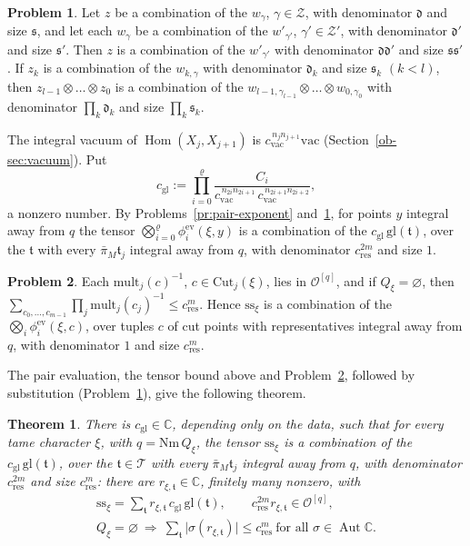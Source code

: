 \documentclass[reqno]{amsart}
\theoremstyle{definition}
\newtheorem{problem}{Problem}[section]
\theoremstyle{plain}
\newtheorem{theorem}{Theorem}[section]
\newcommand{\C}{\mathbb{C}}
\newcommand{\Oc}{\mathcal{O}}
\newcommand{\Tc}{\mathcal{T}}
\newcommand{\Hom}{\operatorname{Hom}}
\newcommand{\Aut}{\operatorname{Aut}}
\newcommand{\Nm}{\mathrm{Nm}\,}
\newcommand{\vac}{\mathrm{vac}}
\newcommand{\gl}{\mathrm{gl}}
\newcommand{\ssx}{\mathrm{ss}_\xi}
\newcommand{\Cut}{\mathrm{Cut}}
\newcommand{\mult}{\mathrm{mult}}
\newcommand{\ev}{\phi^{\mathrm{ev}}}
\newcommand{\cres}{c_{\mathrm{res}}}
\newcommand{\cgl}{c_{\mathrm{gl}}}
\newcommand{\cvac}{c_{\mathrm{vac}}}
\begin{document}
\begin{problem}\label{pr:substitute}
Let \(z\) be a combination of the \(w_\gamma\), \(\gamma\in\mathcal Z\), with denominator \(\mathfrak d\) and size \(\mathfrak s\), and let each \(w_\gamma\) be a combination of the \(w'_{\gamma'}\), \(\gamma'\in\mathcal Z'\), with denominator \(\mathfrak d'\) and size \(\mathfrak s'\).  Then \(z\) is a combination of the \(w'_{\gamma'}\) with denominator \(\mathfrak d\mathfrak d'\) and size \(\mathfrak s\mathfrak s'\).  If \(z_k\) is a combination of the \(w_{k,\gamma}\) with denominator \(\mathfrak d_k\) and size \(\mathfrak s_k\) \((k<l)\), then \(z_{l-1}\otimes\dots\otimes z_0\) is a combination of the \(w_{l-1,\gamma_{l-1}}\otimes\dots\otimes w_{0,\gamma_0}\) with denominator \(\prod_k\mathfrak d_k\) and size \(\prod_k\mathfrak s_k\).
\end{problem}

The integral vacuum of \(\Hom(X_j,X_{j+1})\) is \(\cvac^{\,n_jn_{j+1}}\vac\) (Section~\ref{ob-sec:vacuum}).  Put
\[
  \cgl:=\prod_{i=0}^{\varrho}\frac{C_i}{\cvac^{\,n_{2i}n_{2i+1}}\,\cvac^{\,n_{2i+1}n_{2i+2}}} ,
\]
a nonzero number.  By Problems~\ref{pr:pair-exponent} and~\ref{pr:substitute}, for points \(y\) integral away from \(q\) the tensor \(\bigotimes_{i=0}^{\varrho}\ev_i(\xi,y)\) is a combination of the \(\cgl\,\gl(\mathfrak t)\), over the \(\mathfrak t\) with every \(\bar\pi_M\mathfrak t_j\) integral away from \(q\), with denominator \(\cres^{2m}\) and size \(1\).

\begin{problem}\label{pr:cut-weights}
Each \(\mult_j(c)^{-1}\), \(c\in\Cut_j(\xi)\), lies in \(\Oc^{[q]}\), and if \(Q_\xi=\varnothing\), then \(\sum_{c_0,\dots,c_{m-1}}\prod_j\mult_j(c_j)^{-1}\le\cres^m\).  Hence \(\ssx\) is a combination of the \(\bigotimes_i\ev_i(\xi,c)\), over tuples \(c\) of cut points with representatives integral away from \(q\), with denominator \(1\) and size \(\cres^m\).
\end{problem}

The pair evaluation, the tensor bound above and Problem~\ref{pr:cut-weights}, followed by substitution (Problem~\ref{pr:substitute}), give the following theorem.

\begin{theorem}\label{thm:tensor}
There is \(\cgl\in\C\), depending only on the data, such that for every tame character \(\xi\), with \(q=\Nm Q_\xi\), the tensor \(\ssx\) is a combination of the \(\cgl\,\gl(\mathfrak t)\), over the \(\mathfrak t\in\Tc\) with every \(\bar\pi_M\mathfrak t_j\) integral away from \(q\), with denominator \(\cres^{2m}\) and size \(\cres^m\): there are \(r_{\xi,\mathfrak t}\in\C\), finitely many nonzero, with
\begin{gather*}
  \ssx=\sum_{\mathfrak t}r_{\xi,\mathfrak t}\,\cgl\,\gl(\mathfrak t),\qquad
  \cres^{2m}r_{\xi,\mathfrak t}\in\Oc^{[q]},\\
  Q_\xi=\varnothing\ \Longrightarrow\ \sum_{\mathfrak t}\lvert\sigma(r_{\xi,\mathfrak t})\rvert\le\cres^m\ \text{for all }\sigma\in\Aut\C .
\end{gather*}
\end{theorem}
\end{document}
